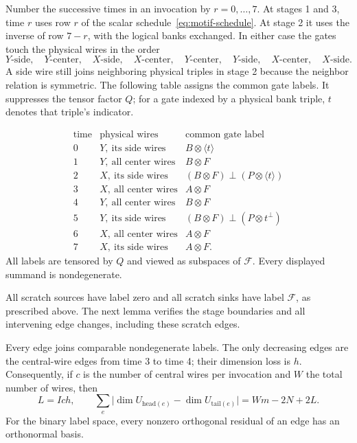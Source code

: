 Number the successive times in an invocation by
$r=0,\ldots,7$. At stages 1 and 3, time $r$ uses row $r$ of the scalar
schedule~\eqref{eq:motif-schedule}. At stage 2 it uses the inverse of
row $7-r$, with the logical banks exchanged. In either case the gates
touch the physical wires in the order
\[
 Y\text{-side},\quad Y\text{-center},\quad X\text{-side},\quad
 X\text{-center},\quad Y\text{-center},\quad Y\text{-side},\quad
 X\text{-center},\quad X\text{-side}.
\]
A side wire still joins neighboring physical triples in stage 2 because
the neighbor relation is symmetric. The following table assigns the
common gate labels. It suppresses the tensor factor $Q$; for a gate
indexed by a physical bank triple, $t$ denotes that triple's indicator.

\begin{equation}
\begin{array}{c|l|l}
\text{time}&\text{physical wires}&\text{common gate label}\\ \hline
0&Y,\ \text{its side wires}&B\otimes\langle t\rangle\\
1&Y,\ \text{all center wires}&B\otimes F\\
2&X,\ \text{its side wires}&(B\otimes F)\mathbin{\perp}(P\otimes\langle t\rangle)\\
3&X,\ \text{all center wires}&A\otimes F\\
4&Y,\ \text{all center wires}&B\otimes F\\
5&Y,\ \text{its side wires}&(B\otimes F)\mathbin{\perp}(P\otimes t^\perp)\\
6&X,\ \text{all center wires}&A\otimes F\\
7&X,\ \text{its side wires}&A\otimes F.
\end{array}
\label{eq:motif-labels}
\end{equation}
All labels are tensored by $Q$ and viewed as subspaces of $\mathcal F$.
Every displayed summand is nondegenerate.

All scratch sources have label zero and all scratch sinks have label
$\mathcal F$, as prescribed above. The next lemma verifies the stage
boundaries and all intervening edge changes, including these scratch
edges.

\begin{lemma}\label{lem:motif-residuals}
Every edge joins comparable nondegenerate labels.  The only decreasing
edges are the central-wire edges from time 3 to time 4; their dimension
loss is $h$.  Consequently, if $c$ is the number of central wires per
invocation and $W$ the total number of wires, then
\begin{equation}
 L=Ich,\qquad
 \sum_{e}\bigl|\dim U_{\mathrm{head}(e)}-
                       \dim U_{\mathrm{tail}(e)}\bigr|
 =Wm-2N+2L.                                      \label{eq:rank-budget-labels}
\end{equation}
For the binary label space, every nonzero orthogonal residual of an
edge has an orthonormal basis.
\end{lemma}

